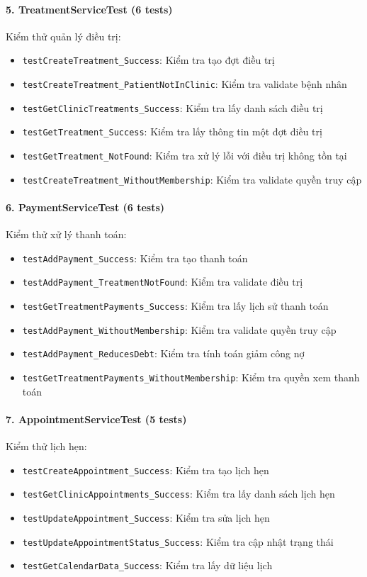 \paragraph{5. TreatmentServiceTest (6 tests)}
Kiểm thử quản lý điều trị:
\begin{itemize}
    \item \texttt{testCreateTreatment\_Success}: Kiểm tra tạo đợt điều trị
    \item \texttt{testCreateTreatment\_PatientNotInClinic}: Kiểm tra validate bệnh nhân
    \item \texttt{testGetClinicTreatments\_Success}: Kiểm tra lấy danh sách điều trị
    \item \texttt{testGetTreatment\_Success}: Kiểm tra lấy thông tin một đợt điều trị
    \item \texttt{testGetTreatment\_NotFound}: Kiểm tra xử lý lỗi với điều trị không tồn tại
    \item \texttt{testCreateTreatment\_WithoutMembership}: Kiểm tra validate quyền truy cập
\end{itemize}

\paragraph{6. PaymentServiceTest (6 tests)}
Kiểm thử xử lý thanh toán:
\begin{itemize}
    \item \texttt{testAddPayment\_Success}: Kiểm tra tạo thanh toán
    \item \texttt{testAddPayment\_TreatmentNotFound}: Kiểm tra validate điều trị
    \item \texttt{testGetTreatmentPayments\_Success}: Kiểm tra lấy lịch sử thanh toán
    \item \texttt{testAddPayment\_WithoutMembership}: Kiểm tra validate quyền truy cập
    \item \texttt{testAddPayment\_ReducesDebt}: Kiểm tra tính toán giảm công nợ
    \item \texttt{testGetTreatmentPayments\_WithoutMembership}: Kiểm tra quyền xem thanh toán
\end{itemize}

\paragraph{7. AppointmentServiceTest (5 tests)}
Kiểm thử lịch hẹn:
\begin{itemize}
    \item \texttt{testCreateAppointment\_Success}: Kiểm tra tạo lịch hẹn
    \item \texttt{testGetClinicAppointments\_Success}: Kiểm tra lấy danh sách lịch hẹn
    \item \texttt{testUpdateAppointment\_Success}: Kiểm tra sửa lịch hẹn
    \item \texttt{testUpdateAppointmentStatus\_Success}: Kiểm tra cập nhật trạng thái
    \item \texttt{testGetCalendarData\_Success}: Kiểm tra lấy dữ liệu lịch
\end{itemize}

